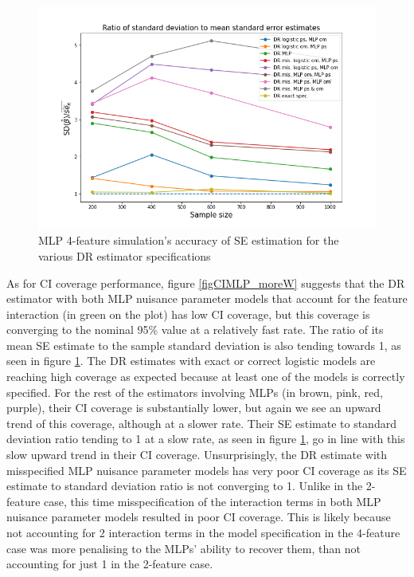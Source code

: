 \documentclass[12pt,twoside]{article}
\begin{document}
\begin{figure}[h!]
    \centering
    \includegraphics[width = 0.9\columnwidth]{figures/SEMLP_moreW.png}
    \caption{MLP 4-feature simulation's accuracy of \citet{lunceford_davidian} SE estimation for the various DR estimator specifications}
    \label{figSEMLP_moreW}
\end{figure}

As for CI coverage performance, figure \ref{figCIMLP_moreW} suggests that the DR estimator with both MLP nuisance parameter models that account for the feature interaction (in green on the plot) has low CI coverage, but this coverage is converging to the nominal 95\% value at a relatively fast rate. The ratio of its mean SE estimate to the sample standard deviation is also tending towards 1, as seen in figure \ref{figSEMLP_moreW}. The DR estimates with exact or correct logistic models are reaching high coverage as expected because at least one of the models is correctly specified. For the rest of the estimators involving MLPs (in brown, pink, red, purple), their CI coverage is substantially lower, but again we see an upward trend of this coverage, although at a slower rate. Their SE estimate to standard deviation ratio tending to 1 at a slow rate, as seen in figure \ref{figSEMLP_moreW}, go in line with this slow upward trend in their CI coverage. Unsurprisingly, the DR estimate with misspecified MLP nuisance parameter models has very poor CI coverage as its SE estimate to standard deviation ratio is not converging to 1. Unlike in the 2-feature case, this time misspecification of the interaction terms in both MLP nuisance parameter models resulted in poor CI coverage. This is likely because not accounting for 2 interaction terms in the model specification in the 4-feature case was more penalising to the MLPs' ability to recover them, than not accounting for just 1 in the 2-feature case.
\end{document}

